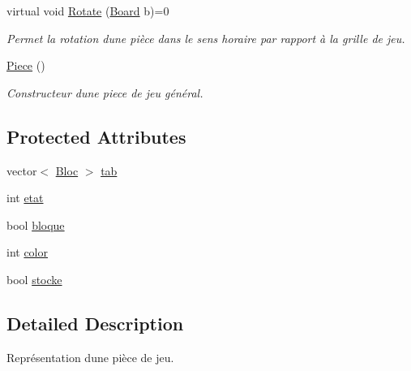 \begin{DoxyCompactItemize}
virtual void \hyperlink{classPiece_a078f3cc6281cb8f60af3ae2266c651ba}{Rotate} (\hyperlink{classBoard}{Board} b)=0
\begin{DoxyCompactList}\small\item\em Permet la rotation d\textquotesingle{}une pièce dans le sens horaire par rapport à la grille de jeu. \end{DoxyCompactList}\item 
\mbox{\label{classPiece_ac57de5803bbad829b143bc7268267dc1}} 
\hyperlink{classPiece_ac57de5803bbad829b143bc7268267dc1}{Piece} ()
\begin{DoxyCompactList}\small\item\em Constructeur d\textquotesingle{}une piece de jeu général. \end{DoxyCompactList}\end{DoxyCompactItemize}
\subsection*{Protected Attributes}
\begin{DoxyCompactItemize}
\item 
vector$<$ \hyperlink{classBloc}{Bloc} $>$ \hyperlink{classPiece_a9ea65e906b9ef0c30594f4f5aa5ed444}{tab}
\item 
int \hyperlink{classPiece_a9632e25aa0e79f8161451a937ccfc7ad}{etat}
\item 
bool \hyperlink{classPiece_a99b4e2bbf91e0e609fc5141135a2e0ad}{bloque}
\item 
int \hyperlink{classPiece_a4268f3b047e1ad284882708b85332ef1}{color}
\item 
bool \hyperlink{classPiece_af0c815c20f2000c02b6d7ce5b6703651}{stocke}
\end{DoxyCompactItemize}


\subsection{Detailed Description}
Représentation d\textquotesingle{}une pièce de jeu. 

